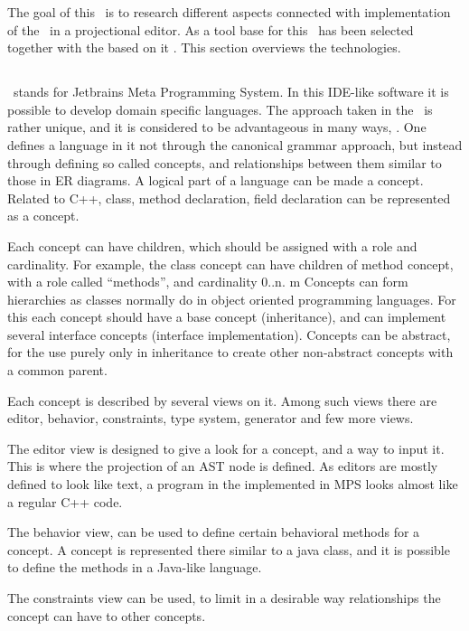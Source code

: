 The goal of this \MT\ is to research different aspects connected with implementation of the \cpppl\ in a projectional editor.
As a tool base for this \jbmps\ has been selected together with the based on it \mbdrp. This section overviews the technologies.

\subsection{\jbmps}

\jbmps\ stands for Jetbrains Meta Programming System. In this IDE-like software it is possible to develop domain specific languages.
The approach taken in the \jbmps\ is rather unique, and it is considered to be advantageous in many ways, \cite{Voelter:MoDELS:2010}. One defines a language in it not through the canonical grammar approach, but instead
through defining so called concepts, and relationships between them similar to those in ER diagrams. A logical part of a language can be made 
a concept. Related to C++, class, method declaration, field declaration can be represented as a concept. 

Each concept can have children, which should be assigned with a role and cardinality. For example, the class concept can have children of method concept,
with a role called ``methods'', and cardinality 0..n.
m
Concepts can form hierarchies as classes normally do in object oriented programming languages. For this each concept should have a base concept (inheritance),
and can implement several interface concepts (interface implementation). Concepts can be abstract, for the use purely only in inheritance to create other 
non-abstract concepts with a common parent.

Each concept is described by several views on it. Among such views there are editor, behavior, constraints, type system, generator and few more views.

The editor view is designed to give a look for a concept, and a way to input it. This is where the projection of an AST node is defined. As editors 
are mostly defined to look like text, a program in the \cpppl implemented in MPS looks almost like a regular C++ code.

The behavior view, can be used to define certain behavioral methods for a concept. A concept is represented there similar to a java class, and
it is possible to define the methods in a Java-like language.

The constraints view can be used, to limit in a desirable way relationships the concept can have to other concepts.

